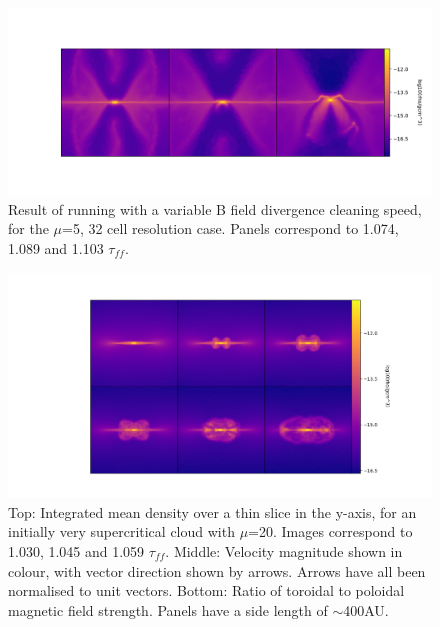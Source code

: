 \documentclass[11pt]{article}
\begin{document}
\begin{figure}[!htb]
         \centering
		\includegraphics[width=18cm]{explosion.png}
		\caption{Result of running with a variable B field divergence cleaning speed, for the $\mu$=5, 32 cell resolution case. Panels correspond to 1.074, 1.089 and 1.103 $\tau_{ff}$.}
		\label{fig:explode}
\end{figure}


\begin{figure}[!htb]
         \centering
		\includegraphics[width=18cm]{burzle.png}
		\caption{Top: Integrated mean density over a thin slice in the y-axis, for an initially very supercritical cloud with $\mu$=20. Images correspond to 1.030, 1.045 and 1.059 $\tau_{ff}$. Middle: Velocity magnitude shown in colour, with vector direction shown by arrows. Arrows have all been normalised to unit vectors. Bottom: Ratio of toroidal to poloidal magnetic field strength. Panels have a side length of $\sim$400AU.}
		\label{fig:burzle}
\end{figure}
\end{document}
